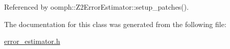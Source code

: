 Referenced by oomph\+::\+Z2\+Error\+Estimator\+::setup\+\_\+patches().



The documentation for this class was generated from the following file\+:\begin{DoxyCompactItemize}
\item 
\hyperlink{error__estimator_8h}{error\+\_\+estimator.\+h}\end{DoxyCompactItemize}
